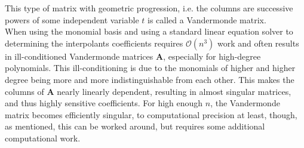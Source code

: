 \documentclass[../../CompleteThesis/Complete_1stDraft]{subfiles}
\begin{document}
This type of matrix with geometric progression, i.e. the columns are successive powers of some independent variable $t$ is called a Vandermonde matrix. \\
When using the monomial basis and using a standard linear equation solver to determining the interpolants coefficients requires $\mathcal{O}(n^3)$ work and often results in ill-conditioned Vandermonde matrices $\boldsymbol{A}$, especially for high-degree polynomials. This ill-conditioning is due to the monomials of higher and higher degree being more and more indistinguishable  from each other. This makes the columns of $\boldsymbol{A}$ nearly linearly dependent, resulting in almost singular matrices, and thus highly sensitive coefficients. For high enough $n$, the Vandermonde matrix becomes efficiently singular, to computational precision at least, though, as mentioned, this can be worked around, but requires some additional computational work. 
\end{document}
